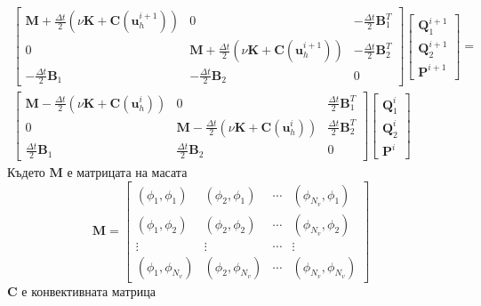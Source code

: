 \documentclass[12pt]{report}
\begin{document}
\begin{multline}\label{eq:2D_DFG_Direct_Crank-Nicholson}
	\begin{bmatrix}
		\mathbf{M}+\frac{\Delta t}{2}\left(\nu\mathbf{K}+\mathbf{C}(\mathbf{u}_h^{i+1})\right) & 0 & -\frac{\Delta t}{2}\mathbf{B}^T_1 \\
		0 &\mathbf{M}+\frac{\Delta t}{2}\left(\nu\mathbf{K}+\mathbf{C}(\mathbf{u}_h^{i+1})\right) & -\frac{\Delta t}{2}\mathbf{B}^T_2 \\
		-\frac{\Delta t}{2}\mathbf{B}_1 & -\frac{\Delta t}{2}\mathbf{B}_2 & 0
	\end{bmatrix}
	\begin{bmatrix}
		\mathbf{Q}_1^{i+1}\\
		\mathbf{Q}_2^{i+1}\\
		\mathbf{P}^{i+1}
	\end{bmatrix} = \\
	\begin{bmatrix}
		\mathbf{M}-\frac{\Delta t}{2}\left(\nu\mathbf{K}+\mathbf{C}(\mathbf{u}_h^{i})\right) & 0 & \frac{\Delta t}{2}\mathbf{B}^T_1 \\
		0 &\mathbf{M}-\frac{\Delta t}{2}\left(\nu\mathbf{K}+\mathbf{C}(\mathbf{u}_h^{i})\right) & \frac{\Delta t}{2}\mathbf{B}^T_2 \\
		\frac{\Delta t}{2}\mathbf{B}_1 & \frac{\Delta t}{2}\mathbf{B}_2 & 0
	\end{bmatrix}
	\begin{bmatrix}
		\mathbf{Q}_1^{i}\\
		\mathbf{Q}_2^{i}\\
		\mathbf{P}^{i}
	\end{bmatrix}
\end{multline}
Където $\mathbf{M}$ е матрицата на масата
\begin{equation*}
	\mathbf{M} =
	\begin{bmatrix}
		\left(\phi_1, \phi_1\right) & \left(\phi_2, \phi_1\right) & \cdots & \left(\phi_{N_v}, \phi_1\right) \\
		\left(\phi_1, \phi_2\right) & \left(\phi_2, \phi_2\right) & \cdots & \left(\phi_{N_v}, \phi_2\right) \\
		\vdots & \vdots & \cdots & \vdots \\
		\left(\phi_1, \phi_{N_v}\right) & \left(\phi_2, \phi_{N_v}\right) & \cdots & \left(\phi_{N_v}, \phi_{N_v}\right)
	\end{bmatrix}
\end{equation*}
$\mathbf{C}$ е конвективната матрица
\end{document}
